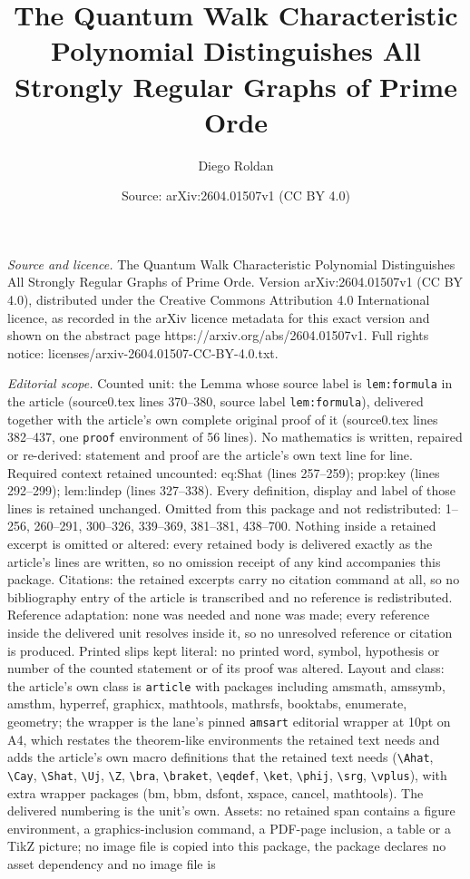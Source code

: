 \documentclass[10pt,a4paper]{amsart}
\title[The Quantum Walk Characteristic Polynomial Distinguishes All]{The Quantum Walk Characteristic Polynomial Distinguishes All Strongly Regular Graphs of Prime Orde}
\author{Diego Roldan}
\date{Source: arXiv:2604.01507v1 (CC BY 4.0)}
\begin{document}
\maketitle

\noindent\emph{Source and licence.} The Quantum Walk Characteristic Polynomial Distinguishes All Strongly Regular Graphs of Prime Orde. Version arXiv:2604.01507v1 (CC BY 4.0), distributed under the Creative Commons Attribution 4.0 International licence, as recorded in the arXiv licence metadata for this exact version and shown on the abstract page https://arxiv.org/abs/2604.01507v1. Full rights notice: licenses/arxiv-2604.01507-CC-BY-4.0.txt.\par\smallskip

\noindent\textit{Editorial scope.} Counted unit: the Lemma whose source label is \texttt{lem:formula} in the article (source0.tex lines 370--380, source label \texttt{lem:formula}), delivered together with the article's own complete original proof of it (source0.tex lines 382--437, one \texttt{proof} environment of 56 lines). No mathematics is written, repaired or re-derived: statement and proof are the article's own text line for line. Required context retained uncounted: eq:Shat (lines 257--259); prop:key (lines 292--299); lem:lindep (lines 327--338). Every definition, display and label of those lines is retained unchanged. Omitted from this package and not redistributed: 1--256, 260--291, 300--326, 339--369, 381--381, 438--700. Nothing inside a retained excerpt is omitted or altered: every retained body is delivered exactly as the article's lines are written, so no omission receipt of any kind accompanies this package. Citations: the retained excerpts carry no citation command at all, so no bibliography entry of the article is transcribed and no reference is redistributed. Reference adaptation: none was needed and none was made; every reference inside the delivered unit resolves inside it, so no unresolved reference or citation is produced. Printed slips kept literal: no printed word, symbol, hypothesis or number of the counted statement or of its proof was altered. Layout and class: the article's own class is \texttt{article} with packages including amsmath, amssymb, amsthm, hyperref, graphicx, mathtools, mathrsfs, booktabs, enumerate, geometry; the wrapper is the lane's pinned \texttt{amsart} editorial wrapper at 10pt on A4, which restates the theorem-like environments the retained text needs and adds the article's own macro definitions that the retained text needs (\texttt{\textbackslash Ahat}, \texttt{\textbackslash Cay}, \texttt{\textbackslash Shat}, \texttt{\textbackslash Uj}, \texttt{\textbackslash Z}, \texttt{\textbackslash bra}, \texttt{\textbackslash braket}, \texttt{\textbackslash eqdef}, \texttt{\textbackslash ket}, \texttt{\textbackslash phij}, \texttt{\textbackslash srg}, \texttt{\textbackslash vplus}), with extra wrapper packages (bm, bbm, dsfont, xspace, cancel, mathtools). The delivered numbering is the unit's own. Assets: no retained span contains a figure environment, a graphics-inclusion command, a PDF-page inclusion, a table or a TikZ picture; no image file is copied into this package, the package declares no asset dependency and no image file is 
\end{document}
